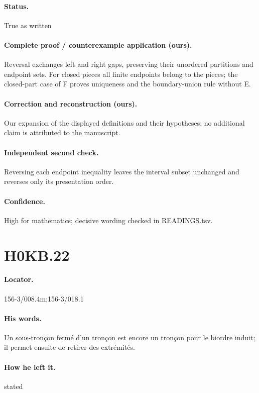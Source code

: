 \paragraph{Status.} True as written

\paragraph{Complete proof / counterexample application (ours).} Reversal exchanges left and right gaps, preserving their unordered partitions and endpoint sets. For closed pieces all finite endpoints belong to the pieces; the closed-part case of F proves uniqueness and the boundary-union rule without E.

\paragraph{Correction and reconstruction (ours).} Our expansion of the displayed definitions and their hypotheses; no additional claim is attributed to the manuscript.

\paragraph{Independent second check.} Reversing each endpoint inequality leaves the interval subset unchanged and reverses only its presentation order.

\paragraph{Confidence.} High for mathematics; decisive wording checked in READINGS.tsv.

\section*{H0KB.22}\label{statement:H0KB.22}
\paragraph{Locator.} 156-3/008.4m;156-3/018.1

\paragraph{His words.} Un sous-tronçon fermé d’un tronçon est encore un tronçon pour le biordre induit; il permet ensuite de retirer des extrémités.

\paragraph{How he left it.} stated


